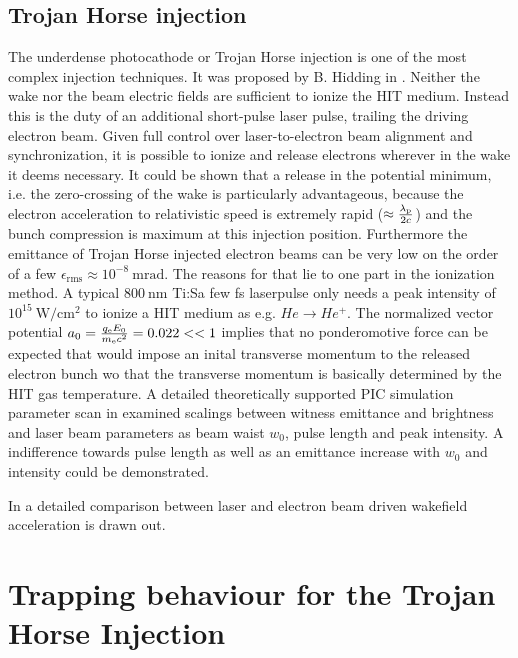 
\subsection{Trojan Horse injection}
\label{sec:Theory_TrojanHorse}
The underdense photocathode or Trojan Horse injection is one of the most complex injection techniques. It was proposed by B. Hidding in \cite{Hidding_PRL_2012}. Neither the wake nor the beam electric fields are sufficient to ionize the HIT medium. Instead this is the duty of an additional short-pulse laser pulse, trailing the driving electron beam. Given full control over laser-to-electron beam alignment and synchronization, it is possible to ionize and release electrons wherever in the wake it deems necessary. It could be shown that a release in the potential minimum, i.e. the zero-crossing of the wake is particularly advantageous, because the electron acceleration to relativistic speed is extremely rapid ($\approx \frac{\lambda_\mathrm{p}}{2c}$) and the bunch compression is maximum at this injection position. Furthermore the emittance of Trojan Horse injected electron beams can be very low on the order of a few $\epsilon_\mathrm{rms}\approx 10^{-8}\ \mathrm{m rad}$. The reasons for that lie to one part in the ionization method. A typical $800\ \mathrm{nm}$ Ti:Sa few fs laserpulse only needs a peak intensity of $10^{15}\ \mathrm{W/cm^2}$ to ionize a HIT medium as e.g. $He \rightarrow He^+$. The normalized vector potential $a_0 = \frac{q_\mathrm{e} E_0}{m_\mathrm{e} c^2} = 0.022<<1$ implies that no ponderomotive force can be expected that would impose an inital transverse momentum to the released electron bunch wo that the transverse momentum is basically determined by the HIT gas temperature. 
A detailed theoretically supported PIC simulation parameter scan in \cite{xi2013hybrid} examined scalings between witness emittance and brightness and laser beam parameters as beam waist $w_0$, pulse length and peak intensity. A indifference towards pulse length as well as an emittance increase with $w_0$ and intensity could be demonstrated.

In \cite{hidding2014ultrahigh} a detailed comparison between laser and electron beam driven wakefield acceleration is drawn out.
 
\section{Trapping behaviour for the Trojan Horse Injection}


